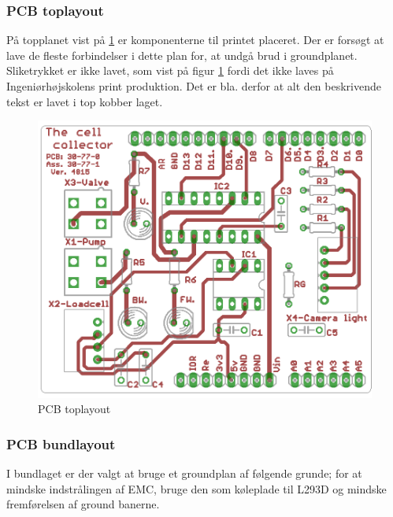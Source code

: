 \newpage
\subsubsection{PCB toplayout}
På topplanet vist på \ref{fig:PCBtoplayout} er komponenterne til printet placeret. Der er forsøgt at lave de fleste forbindelser i dette plan for, at undgå brud i groundplanet. Sliketrykket er ikke lavet, som vist på figur \ref{fig:PCBtoplayout} fordi det ikke laves på Ingeniørhøjskolens print produktion. Det er bla. derfor at alt den beskrivende tekst er lavet i top kobber laget. 

\begin{figure}[H]
	\centering
	\includegraphics[width=1\textwidth]{billeder/hardware/Toplayout.png}
	\caption{PCB toplayout}
	\label{fig:PCBtoplayout}
\end{figure}

\newpage
\subsubsection{PCB bundlayout}
I bundlaget er der valgt at bruge et groundplan af følgende grunde; for at mindske indstrålingen af EMC, bruge den som køleplade til L293D og mindske fremførelsen af ground banerne. 

